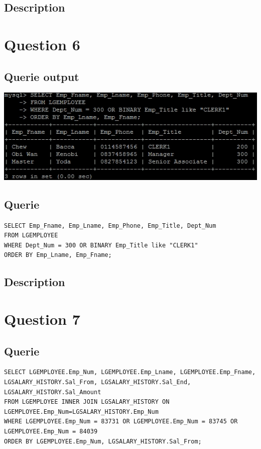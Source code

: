 \documentclass[a4paper,10pt]{article}
\begin{document}
\subsection{Description}\section*{Question 6}
\subsection{Querie output}
           \includegraphics{Queries/Question_6/Q6_screenshot.jpg}
 \subsection{Querie}
          \lstset{
            language=SQL,
            breaklines=true
            }
        \begin{lstlisting}[frame=single]
        SELECT Emp_Fname, Emp_Lname, Emp_Phone, Emp_Title, Dept_Num
FROM LGEMPLOYEE
WHERE Dept_Num = 300 OR BINARY Emp_Title like "CLERK1"
ORDER BY Emp_Lname, Emp_Fname;

        \end{lstlisting}
\subsection{Description}\section*{Question 7}
 \subsection{Querie}
          \lstset{
            language=SQL,
            breaklines=true
            }
        \begin{lstlisting}[frame=single]
        SELECT LGEMPLOYEE.Emp_Num, LGEMPLOYEE.Emp_Lname, LGEMPLOYEE.Emp_Fname, LGSALARY_HISTORY.Sal_From, LGSALARY_HISTORY.Sal_End, LGSALARY_HISTORY.Sal_Amount
FROM LGEMPLOYEE INNER JOIN LGSALARY_HISTORY ON LGEMPLOYEE.Emp_Num=LGSALARY_HISTORY.Emp_Num
WHERE LGEMPLOYEE.Emp_Num = 83731 OR LGEMPLOYEE.Emp_Num = 83745 OR LGEMPLOYEE.Emp_Num = 84039
ORDER BY LGEMPLOYEE.Emp_Num, LGSALARY_HISTORY.Sal_From;

        \end{lstlisting}
\end{document}
